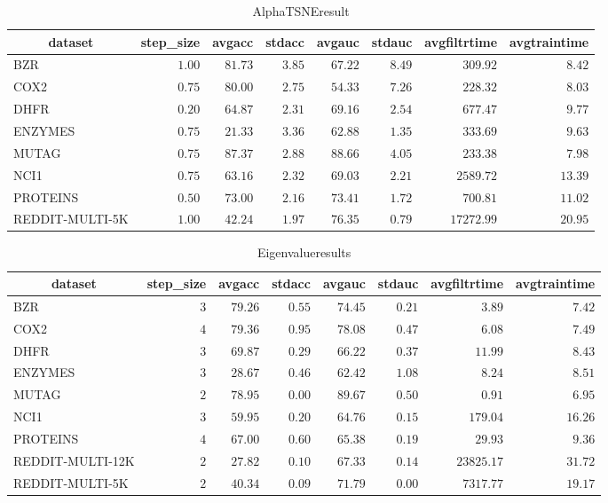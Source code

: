\begin{table}[!tbp]
\caption{AlphaTSNEresult\label{AlphaTSNEresult}} 
{\centering
\begin{tabular}{lrrrrrrr}
\hline\hline
\multicolumn{1}{c}{dataset}&\multicolumn{1}{c}{step_size}&\multicolumn{1}{c}{avgacc}&\multicolumn{1}{c}{stdacc}&\multicolumn{1}{c}{avgauc}&\multicolumn{1}{c}{stdauc}&\multicolumn{1}{c}{avgfiltrtime}&\multicolumn{1}{c}{avgtraintime}\tabularnewline
\hline
BZR&$1.00$&$81.73$&$3.85$&$67.22$&$8.49$&$  309.92$&$ 8.42$\tabularnewline
COX2&$0.75$&$80.00$&$2.75$&$54.33$&$7.26$&$  228.32$&$ 8.03$\tabularnewline
DHFR&$0.20$&$64.87$&$2.31$&$69.16$&$2.54$&$  677.47$&$ 9.77$\tabularnewline
ENZYMES&$0.75$&$21.33$&$3.36$&$62.88$&$1.35$&$  333.69$&$ 9.63$\tabularnewline
MUTAG&$0.75$&$87.37$&$2.88$&$88.66$&$4.05$&$  233.38$&$ 7.98$\tabularnewline
NCI1&$0.75$&$63.16$&$2.32$&$69.03$&$2.21$&$ 2589.72$&$13.39$\tabularnewline
PROTEINS&$0.50$&$73.00$&$2.16$&$73.41$&$1.72$&$  700.81$&$11.02$\tabularnewline
REDDIT-MULTI-5K&$1.00$&$42.24$&$1.97$&$76.35$&$0.79$&$17272.99$&$20.95$\tabularnewline
\hline
\end{tabular}}
\end{table}
\begin{table}[!tbp]
\caption{Eigenvalueresults\label{Eigenvalueresults}} 
{\centering
\begin{tabular}{lrrrrrrr}
\hline\hline
\multicolumn{1}{c}{dataset}&\multicolumn{1}{c}{step_size}&\multicolumn{1}{c}{avgacc}&\multicolumn{1}{c}{stdacc}&\multicolumn{1}{c}{avgauc}&\multicolumn{1}{c}{stdauc}&\multicolumn{1}{c}{avgfiltrtime}&\multicolumn{1}{c}{avgtraintime}\tabularnewline
\hline
BZR&$3$&$79.26$&$0.55$&$74.45$&$0.21$&$    3.89$&$ 7.42$\tabularnewline
COX2&$4$&$79.36$&$0.95$&$78.08$&$0.47$&$    6.08$&$ 7.49$\tabularnewline
DHFR&$3$&$69.87$&$0.29$&$66.22$&$0.37$&$   11.99$&$ 8.43$\tabularnewline
ENZYMES&$3$&$28.67$&$0.46$&$62.42$&$1.08$&$    8.24$&$ 8.51$\tabularnewline
MUTAG&$2$&$78.95$&$0.00$&$89.67$&$0.50$&$    0.91$&$ 6.95$\tabularnewline
NCI1&$3$&$59.95$&$0.20$&$64.76$&$0.15$&$  179.04$&$16.26$\tabularnewline
PROTEINS&$4$&$67.00$&$0.60$&$65.38$&$0.19$&$   29.93$&$ 9.36$\tabularnewline
REDDIT-MULTI-12K&$2$&$27.82$&$0.10$&$67.33$&$0.14$&$23825.17$&$31.72$\tabularnewline
REDDIT-MULTI-5K&$2$&$40.34$&$0.09$&$71.79$&$0.00$&$ 7317.77$&$19.17$\tabularnewline
\hline
\end{tabular}}
\end{table}
